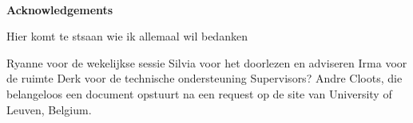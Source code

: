 \begin{titlepage} 
\begin{center}
\HRule \\[0.4cm] { \huge \bfseries Acknowledgements\\[0.4cm] }

Hier komt te stsaan wie ik allemaal wil bedanken

Ryanne voor de wekelijkse sessie
Silvia voor het doorlezen en adviseren
Irma voor de ruimte
Derk voor de technische ondersteuning
Supervisors?
Andre Cloots, die belangeloos een document opstuurt na een request op de site van University of Leuven, Belgium.
\end{center}
\end{titlepage}
